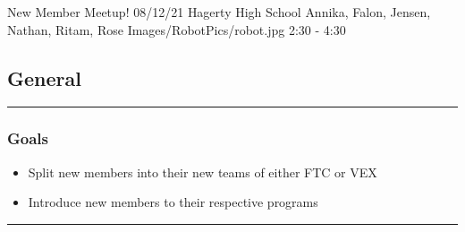 \insertmeeting 
	{New Member Meetup!} 
	{08/12/21}
	{Hagerty High School}
	{Annika, Falon, Jensen, Nathan, Ritam, Rose}
	{Images/RobotPics/robot.jpg}
	{2:30 - 4:30}
	
\subsection*{General}
\noindent\hfil\rule{\textwidth}{.4pt}\hfil
\subsubsection*{Goals}
\begin{itemize}
    \item Split new members into their new teams of either FTC or VEX
	\item Introduce new members to their respective programs  

\end{itemize} 

\noindent\hfil\rule{\textwidth}{.4pt}\hfil

